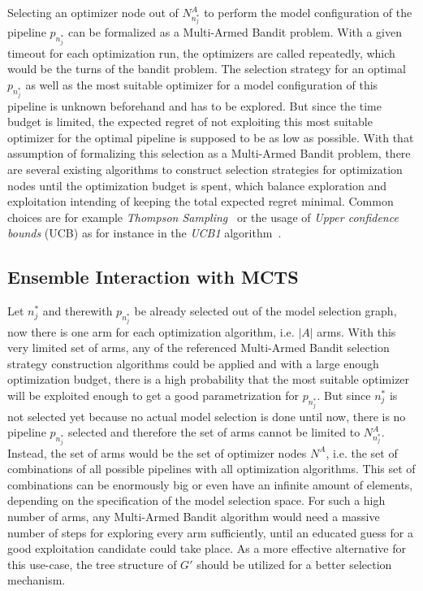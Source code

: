 Selecting an optimizer node out of $N^A_{n^*_j}$ to perform the model configuration of the pipeline $p_{n^*_j}$ can be formalized as a Multi-Armed Bandit problem.
With a given timeout for each optimization run, the optimizers are called repeatedly, which would be the turns of the bandit problem.
The selection strategy for an optimal $p_{n^*_j}$ as well as the most suitable optimizer for a model configuration of this pipeline is unknown beforehand and has to be explored.
But since the time budget is limited, the expected regret of not exploiting this most suitable optimizer for the optimal pipeline is supposed to be as low as possible.\newline
With that assumption of formalizing this selection as a Multi-Armed Bandit problem, there are several existing algorithms to construct selection strategies for optimization nodes until the optimization budget is spent, which balance exploration and exploitation intending of keeping the total expected regret minimal.
Common choices are for example \textit{Thompson Sampling}~\cite{Thompson-Sampling} or the usage of \textit{Upper confidence bounds} (UCB) as for instance in the \textit{UCB1} algorithm~\cite{Auer-UCB1}.

\subsection{Ensemble Interaction with MCTS}
\label{sec:approach:selection:mcts}
Let $n^*_j$ and therewith $p_{n^*_j}$ be already selected out of the model selection graph, now there is one arm for each optimization algorithm, i.e. $|A|$ arms.
With this very limited set of arms, any of the referenced Multi-Armed Bandit selection strategy construction algorithms could be applied and with a large enough optimization budget, there is a high probability that the most suitable optimizer will be exploited enough to get a good parametrization for $p_{n^*_j}$.\newline
But since $n^*_j$ is not selected yet because no actual model selection is done until now, there is no pipeline $p_{n^*_j}$ selected and therefore the set of arms cannot be limited to $N^A_{n^*_j}$.
Instead, the set of arms would be the set of optimizer nodes $N^A$, i.e. the set of combinations of all possible pipelines with all optimization algorithms.
This set of combinations can be enormously big or even have an infinite amount of elements, depending on the specification of the model selection space.
For such a high number of arms, any Multi-Armed Bandit algorithm would need a massive number of steps for exploring every arm sufficiently, until an educated guess for a good exploitation candidate could take place.
As a more effective alternative for this use-case, the tree structure of $G'$ should be utilized for a better selection mechanism.


